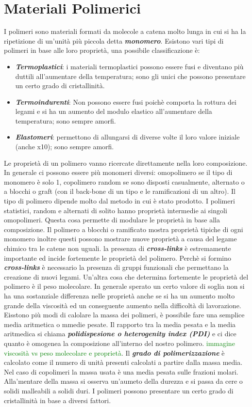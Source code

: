 \newpage
\section{Materiali Polimerici}
I polimeri sono materiali formati da molecole a catena molto lunga in cui si ha la ripetizione di un'unità più piccola detta \textbf{\textit{monomero}}. Esistono vari tipi di polimeri in base alle loro proprietà, una possibile classificazione è:
\begin{itemize}
    \item \textbf{\textit{Termoplastici}}: i materiali termoplastici possono essere fusi e diventano più duttili all'aumentare della temperatura; sono gli unici che possono presentare un certo grado di cristallinità.
    \item \textbf{\textit{Termoindurenti}}: Non possono essere fusi poichè comporta la rottura dei legami e si ha un aumento del modulo elastico all'aumentare della temperatura; sono sempre amorfi. 
    \item \textbf{\textit{Elastomeri}}: permettono di allungarsi di diverse volte il loro valore iniziale (anche x10); sono sempre amorfi.
\end{itemize}
Le proprietà di un polimero vanno ricercate direttamente nella loro composizione.
In generale ci possono essere più monomeri diversi: omopolimero se il tipo di monomero è solo 1, copolimero random se sono disposti casualmente, alternato o a blocchi o graft (con il back-bone di un tipo e le ramificazioni di un altro). Il tipo di polimero dipende molto dal metodo in cui è stato prodotto. I polimeri statistici, random e alternati di solito hanno proprietà intermedie ai singoli omopolimeri. Questa cosa permette di modulare le proprietà in base alla composizione.
Il polimero a blocchi o ramificato mostra proprietà tipiche di ogni monomero inoltre questi possono mostrare nuove proprietà a causa del legame chimico tra le catene non uguali. la presenza di \textbf{\textit{cross-links}} è estremamente importante ed incide fortemente le proprietà del polimero. Perchè si formino \textbf{\textit{cross-links}} è necessario la presenza di gruppi funzionali che permettano la creazione di nuovi legami. Un'altra cosa che determina fortemente le proprietà del polimero è il peso molecolare. In generale sperato un certo valore di soglia non si ha una sostanziale differenza nelle proprietà anche se si ha un aumento molto grande della viscosità ed un conseguente aumento nella difficoltà di lavorazione. Eisstono più modi di calolare la massa dei polimeri, è possibile fare una semplice media aritmetica o mmedie pesate. Il rapporto tra la media pesata e la media aritmedica si chiama \textbf{\textit{polidispesione o heterogenity index (PDI)}} e ci dice quanto è omogenea la composizione all'interno del nostro polimero. \textcolor{green}{immagine viscosità vs peso molecolare e proprietà}. Il \textbf{\textit{grado di polimerizzazione}} è calcolato come il numero di unità presenti calcolati a partire dalla massa media. Nel caso di copolimeri la massa usata è una media pesata sulle frazioni molari. Alla'mentare della massa si osserva un'aumeto della durezza e si passa da cere o solidi malleabili a solidi duri. I polimeri possono presentare un certo grado di cristallinità in base a diversi fattori. 
